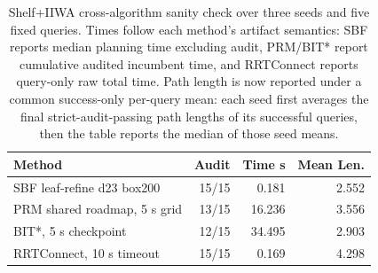 \begin{table}[t]
\centering
\caption{Shelf+IIWA cross-algorithm sanity check over three seeds and five fixed queries. Times follow each method's artifact semantics: SBF reports median planning time excluding audit, PRM/BIT* report cumulative audited incumbent time, and RRTConnect reports query-only raw total time. Path length is now reported under a common success-only per-query mean: each seed first averages the final strict-audit-passing path lengths of its successful queries, then the table reports the median of those seed means.}
\label{tab:tro_shelf_cross_algorithm}
\footnotesize
\setlength{\tabcolsep}{2.4pt}
\begin{tabular}{lrrr}
\toprule
Method & Audit & Time s & Mean Len. \\
\midrule
SBF leaf-refine d23 box200 & 15/15 & 0.181 & 2.552 \\
PRM shared roadmap, 5 s grid & 13/15 & 16.236 & 3.556 \\
BIT*, 5 s checkpoint & 12/15 & 34.495 & 2.903 \\
RRTConnect, 10 s timeout & 15/15 & 0.169 & 4.298 \\
\bottomrule
\end{tabular}
\end{table}
